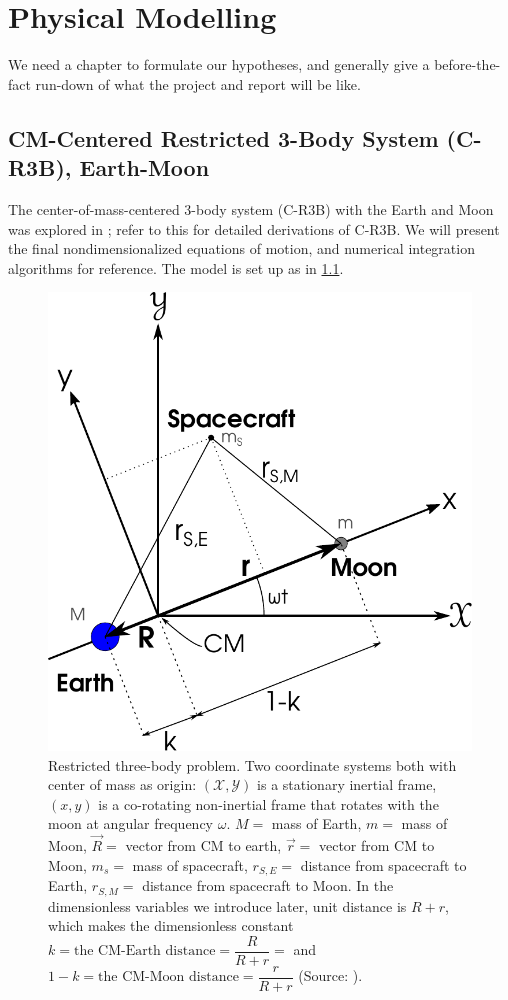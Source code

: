 
\chapter{Physical Modelling}
We need a chapter to formulate our hypotheses, and generally give a before-the-fact run-down of what the project and report will be like.

\section{CM-Centered Restricted 3-Body System (C-R3B), Earth-Moon}
The center-of-mass-centered 3-body system (C-R3B) with the Earth and Moon was explored in \cite{Saxe2015}; refer to this for detailed derivations of C-R3B. We will present the final nondimensionalized equations of motion, and numerical integration algorithms for reference. The model is set up as in \cref{fig:r3b}.

\begin{figure}[ht!]
    \centering
    \includegraphics[scale=0.75]{fig/r3b.pdf}
    \caption{Restricted three-body problem. Two coordinate systems both with center of mass as origin: $(\mathscr{X},\mathscr{Y})$ is a stationary inertial frame, $(x,y)$ is a co-rotating non-inertial frame that rotates with the moon at angular frequency $\omega$. $M =$ mass of Earth, $m =$ mass of Moon, $\vec{R} =$ vector from CM to earth, $\vec{r} =$ vector from CM to Moon, $m_s =$ mass of spacecraft, $r_{S,E} =$ distance from spacecraft to Earth, $r_{S,M} =$ distance from spacecraft to Moon. In the dimensionless variables we introduce later, unit distance is $R+r$, which makes the dimensionless constant $k = \text{the CM-Earth distance} = \dfrac{R}{R+r} = $ and $1-k = \text{the CM-Moon distance} = \dfrac{r}{R+r}$ (Source: \cite{Saxe2015}).}
    \label{fig:r3b}
\end{figure}

